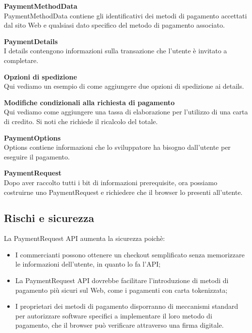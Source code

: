 \documentclass[11pt ,a4paper , twoside , openright ]{article}
\begin{document}
\pagebreak
\textbf{PaymentMethodData}
\\
PaymentMethodData contiene gli identificativi dei metodi di pagamento accettati dal sito Web e qualsiasi dato specifico del metodo di pagamento associato.

\textbf{PaymentDetails}
\\
I details contengono informazioni sulla transazione che l'utente è invitato a completare.

\pagebreak
\textbf{Opzioni di spedizione}
\\
Qui vediamo un esempio di come aggiungere due opzioni di spedizione ai details.


\flushleft\textbf{Modifiche condizionali alla richiesta di pagamento}
\\
Qui vediamo come aggiungere una tassa di elaborazione per l'utilizzo di una carta di credito. Si noti che richiede il ricalcolo del totale.

\pagebreak
\textbf{PaymentOptions} \\
Options contiene informazioni che lo sviluppatore ha bisogno dall'utente per eseguire il pagamento.


\textbf{PaymentRequest} \\
Dopo aver raccolto tutti i bit di informazioni prerequisite, ora possiamo costruirne uno PaymentRequest e richiedere che il browser lo presenti all'utente.


\subsection{Rischi e sicurezza}
La PaymentRequest API aumenta la sicurezza poichè:
\begin{itemize}
	\item I commercianti possono ottenere un checkout semplificato senza memorizzare le informazioni dell'utente, in quanto lo fa l'API;
	\item La PaymentRequest API dovrebbe facilitare l'introduzione di metodi di pagamento più sicuri sul Web, come i pagamenti con carta tokenizzata;
	\item I proprietari dei metodi di pagamento disporranno di meccanismi standard per autorizzare software specifici a implementare il loro metodo di pagamento, che il browser può verificare attraverso una firma digitale.
\end{itemize}
\end{document}

